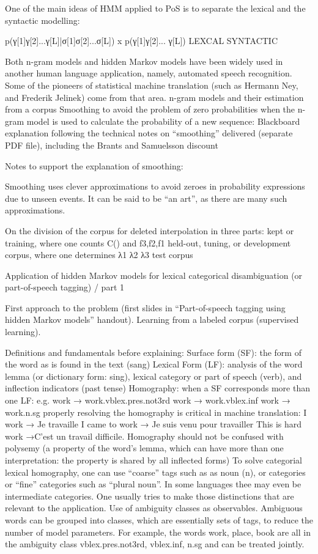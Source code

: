 One of the main ideas of HMM applied to PoS is to separate the lexical and the syntactic modelling:	
	 	
p(γ[1]γ[2]...γ[L]|σ[1]σ[2]...σ[L])	x	p(γ[1]γ[2]... γ[L])
{		LEXCAL	 }		{ SYNTACTIC }




Both n-gram models and hidden Markov models have been widely used in another human language  application, namely, automated speech recognition. Some of the pioneers of statistical machine translation (such as Hermann Ney, and Frederik Jelinek) come from that area.
n-gram models and their estimation from a corpus
Smoothing to avoid the problem of zero probabilities when the n-gram model is used to calculate the probability of a new sequence: Blackboard explanation following the technical notes on “smoothing” delivered (separate PDF file), including the Brants and Samuelsson discount

Notes to support the explanation of smoothing: 
	 	 	
Smoothing uses clever approximations to avoid zeroes in probability expressions due to unseen events. It can be said to be “an art”, as there are many such approximations.

On the division of the corpus for deleted interpolation in three parts:
kept or training, where one counts 	C() and  f3,f2,f1
held-out, tuning, or development corpus, where one determines λ1 λ2 λ3
test corpus


Application of hidden Markov models for lexical categorical disambiguation (or part-of-speech tagging) / part 1

First approach to the problem (first slides in “Part-of-speech tagging using hidden Markov models” handout). Learning from a labeled corpus (supervised learning).

Definitions and fundamentals before explaining:
Surface form (SF): the form of the word as is found in the text (sang)
Lexical Form (LF): analysis of the word 
lemma (or dictionary form: sing), 
lexical category or part of speech (verb), and 
inflection indicators (past tense)
Homography: when a SF corresponds more than one LF: e.g.
work → work.vblex.pres.not3rd
work → work.vblex.inf
work → work.n.sg 
properly resolving the homography is critical in machine translation:
I work → Je travaille
I came to work → Je suis venu pour travailler
This is hard work →C’est un travail difficile.
Homography should not be confused with polysemy (a property of the word’s lemma, which can have more than one interpretation: the property is shared by all inflected forms)
To solve categorial lexical homography, one can use “coarse” tags such as as noun (n), or categories or “fine” categories such as “plural noun”. In some languages thee may even be intermediate categories. One usually tries to make those distinctions that are relevant to the application.
Use of ambiguity classes as observables. Ambiguous words can be grouped into  classes, which are essentially sets of tags, to reduce the number of model parameters. For example, the words work, place, book are all in the ambiguity class {vblex.pres.not3rd, vblex.inf, n.sg} and can be treated jointly.

